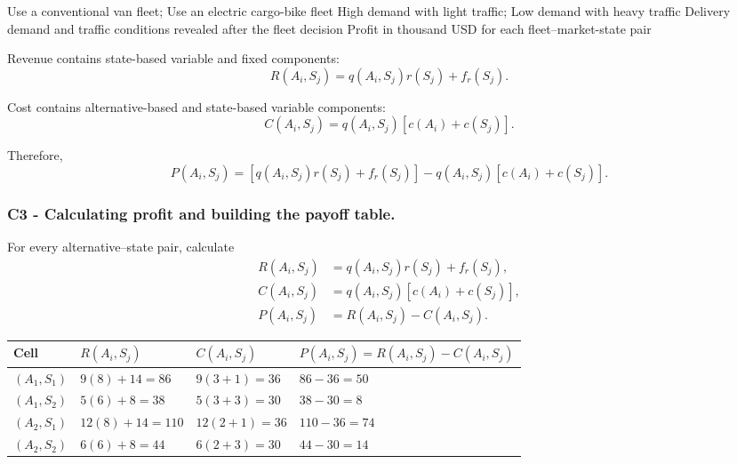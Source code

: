 \DecisionElementsTable
{Use a conventional van fleet; Use an electric cargo-bike fleet}
{High demand with light traffic; Low demand with heavy traffic}
{Delivery demand and traffic conditions revealed after the fleet decision}
{Profit in thousand USD for each fleet--market-state pair}

Revenue contains state-based variable and fixed components:
\[
R(A_i,S_j)
=
q(A_i,S_j)r(S_j)+f_r(S_j).
\]

Cost contains alternative-based and state-based variable components:
\[
C(A_i,S_j)
=
q(A_i,S_j)
\left[
c(A_i)+c(S_j)
\right].
\]

Therefore,
\[
P(A_i,S_j)
=
\left[
q(A_i,S_j)r(S_j)+f_r(S_j)
\right]
-
q(A_i,S_j)
\left[
c(A_i)+c(S_j)
\right].
\]


\subsubsection*{C3 - Calculating profit and building the payoff table.}
\label{subsec:problem13-urban-delivery-fleet-c3}

For every alternative--state pair, calculate
\[
\begin{aligned}
	R(A_i,S_j)
	&=
	q(A_i,S_j)r(S_j)+f_r(S_j),
	\\
	C(A_i,S_j)
	&=
	q(A_i,S_j)
	\left[
	c(A_i)+c(S_j)
	\right],
	\\
	P(A_i,S_j)
	&=
	R(A_i,S_j)-C(A_i,S_j).
\end{aligned}
\]

\begin{center}
	\small
	\begin{tabular}{llll}
		\toprule
		Cell
		& \(R(A_i,S_j)\)
		& \(C(A_i,S_j)\)
		& \(P(A_i,S_j)=R(A_i,S_j)-C(A_i,S_j)\) \\
		\midrule
		\((A_1,S_1)\)
		& \(9(8)+14=86\)
		& \(9(3+1)=36\)
		& \(86-36=50\) \\
		
		\((A_1,S_2)\)
		& \(5(6)+8=38\)
		& \(5(3+3)=30\)
		& \(38-30=8\) \\
		
		\((A_2,S_1)\)
		& \(12(8)+14=110\)
		& \(12(2+1)=36\)
		& \(110-36=74\) \\
		
		\((A_2,S_2)\)
		& \(6(6)+8=44\)
		& \(6(2+3)=30\)
		& \(44-30=14\) \\
		\bottomrule
	\end{tabular}
\end{center}

